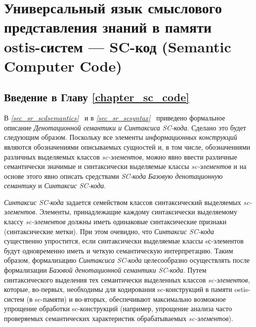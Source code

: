 \chapter{Универсальный язык смыслового представления знаний в памяти ostis-систем --- SC-код (Semantic Computer Code)}
\label{chapter_sc_code}

\vspace{-7\baselineskip}

\section*{Введение в Главу \ref{chapter_sc_code}}

В \textit{\ref{sec_sr_scdsemantics}~} и в \textit{\ref{sec_sr_scsyntax}~} приведено формальное описание \textit{Денотационной семантики и Синтаксиса SC-кода}. Сделано это будет следующим образом. Поскольку все элементы \textit{информационных конструкций} являются обозначениями описываемых сущностей и, в том числе, обозначениями различных выделяемых классов \textit{sc-элементов}, можно явно ввести различные семантически значимые и синтаксически выделяемые классы \textit{sc-элементов} и на основе этого явно описать средствами \textit{SC-кода} \textit{Базовую денотационную семантику} и \textit{Синтаксис SC-кода}.
 
\textit{Синтаксис SC-кода} задается семейством классов синтаксический выделяемых \textit{sc-элементов}. Элементы, принадлежащие каждому синтаксически выделяемому классу \textit{sc-элементов} должны иметь одинаковые синтаксические признаки (синтаксические метки). При этом очевидно, что \textit{Синтаксис SC-кода} существенно упростится, если синтаксически выделяемые классы sс-элементов будут одновременно иметь и четкую семантическую интерпретацию. Таким образом, формализацию \textit{Синтаксиса SC-кода} целесообразно осуществлять после формализации \textit{Базовой денотационной семантики SC-кода}. Путем синтаксического выделения тех семантически выделенных классов \textit{sc-элементов}, которые, во-первых, необходимы для кодирования sc-конструкций в памяти ostis-систем (в sc-памяти) и во-вторых, обеспечивают максимально возможное упрощение обработки sc-конструкций (например, упрощение анализа часто проверяемых семантических характеристик обрабатываемых \textit{sc-элементов}).

